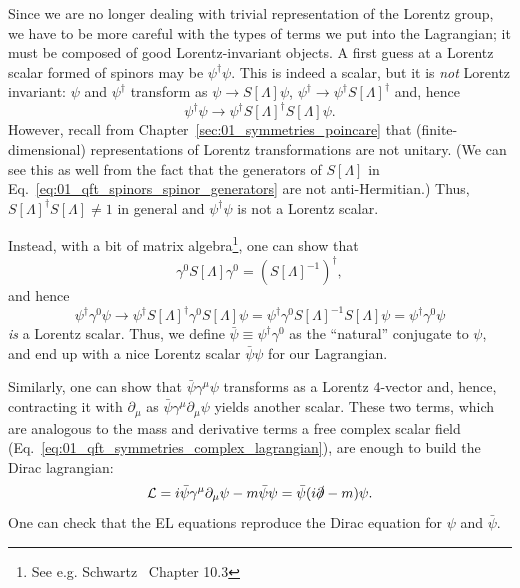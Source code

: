 Since we are no longer dealing with trivial representation of the Lorentz group, we have to be more careful with the types of terms we put into the Lagrangian; it must be composed of good Lorentz-invariant objects.
A first guess at a Lorentz scalar formed of spinors may be $\psi^\dagger\psi$.
This is indeed a scalar, but it is \textit{not} Lorentz invariant:
$\psi$ and $\psi^\dagger$ transform as $\psi\rightarrow S[\Lambda]\psi$, $\psi^\dagger\rightarrow \psi^\dagger S[\Lambda]^\dagger$ and, hence
\begin{equation}
	\label{eq:01_qft_spinors_lagrangian_scalar_wrong}
	\psi^\dagger\psi \rightarrow \psi^\dagger S[\Lambda]^\dagger S[\Lambda]\psi. %
\end{equation}
However, recall from Chapter~\ref{sec:01_symmetries_poincare} that (finite-dimensional) representations of Lorentz transformations are not unitary.
(We can see this as well from the fact that the generators of $S[\Lambda]$ in Eq.~\ref{eq:01_qft_spinors_spinor_generators} are not anti-Hermitian.)
Thus, $S[\Lambda]^\dagger S[\Lambda] \neq 1$ in general and $\psi^\dagger\psi$ is not a Lorentz scalar.

Instead, with a bit of matrix algebra\footnote{See e.g. Schwartz~\cite{Schwartz:2014sze} Chapter 10.3}, one can show that
\begin{equation}
	\label{eq:01_qft_spinors_gamma0_inverse}
	\gamma^0 S[\Lambda] \gamma^0 = (S[\Lambda]^{-1})^\dagger,
\end{equation}
and hence
\begin{equation}
	\label{eq:01_qft_spinors_lagrangian_scalar}
	\psi^\dagger\gamma^0\psi \rightarrow \psi^\dagger S[\Lambda]^\dagger \gamma^0 S[\Lambda]\psi = \psi^\dagger\gamma^0 S[\Lambda]^{-1} S[\Lambda]\psi = \psi^\dagger\gamma^0\psi
\end{equation}
\textit{is} a Lorentz scalar.
Thus, we define $\bar\psi \equiv \psi^\dagger\gamma^0$ as the ``natural'' conjugate to $\psi$, and end up with a nice Lorentz scalar $\bar\psi \psi$ for our Lagrangian.

Similarly, one can show that $\bar\psi\gamma^\mu\psi$ transforms as a Lorentz $4$-vector and, hence, contracting it with $\partial_\mu$ as $\bar\psi\gamma^\mu\partial_\mu\psi$ yields another scalar.
These two terms, which are analogous to the mass and derivative terms a free complex scalar field (Eq.~\ref{eq:01_qft_symmetries_complex_lagrangian}), are enough to build the Dirac lagrangian:
\begin{equation}
	\label{eq:01_qft_spinors_lagrangian}
	\mathcal{L} = i\bar\psi\gamma^\mu\partial_\mu\psi - m\bar\psi\psi = \bar\psi(i\slashed{\partial} - m)\psi.
\end{equation}
One can check that the EL equations reproduce the Dirac equation for $\psi$ and $\bar\psi$.

